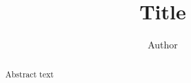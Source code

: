 \documentclass[a4paper]{article}
\title{Title}
\author{Author}
\begin{document}
\maketitle
\begin{abstract}
  Abstract text
\end{abstract}
\end{document}
